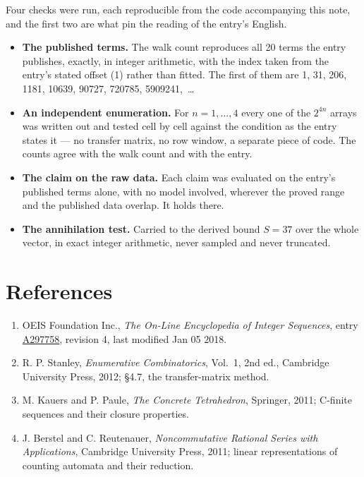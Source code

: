 \documentclass[11pt]{article}
\theoremstyle{definition}
\begin{document}
Four checks were run, each reproducible from the code accompanying this note, and the first two are what pin the reading of the entry's English.

\begin{itemize}

\item {\bfseries The published terms.} The walk count reproduces all 20 terms the entry publishes, exactly, in integer arithmetic, with the index taken from the entry's stated offset (1) rather than fitted. The first of them are 1, 31, 206, 1181, 10639, 90727, 720785, 5909241,~\dots

\item {\bfseries An independent enumeration.} For $n = 1,\dots,4$ every one of the $2^{4n}$ arrays was written out and tested cell by cell against the condition as the entry states it --- no transfer matrix, no row window, a separate piece of code. The counts agree with the walk count and with the entry.

\item {\bfseries The claim on the raw data.} Each claim was evaluated on the entry's published terms alone, with no model involved, wherever the proved range and the published data overlap. It holds there.

\item {\bfseries The annihilation test.} Carried to the derived bound $S = 37$ over the whole vector, in exact integer arithmetic, never sampled and never truncated.

\end{itemize}

\section{References}

\begin{enumerate}

\item OEIS Foundation Inc., \emph{The On-Line Encyclopedia of Integer Sequences}, entry \href{https://oeis.org/A297758}{A297758}, revision 4, last modified Jan 05 2018.

\item R. P. Stanley, \emph{Enumerative Combinatorics}, Vol.~1, 2nd ed., Cambridge University Press, 2012; \S4.7, the transfer-matrix method.

\item M. Kauers and P. Paule, \emph{The Concrete Tetrahedron}, Springer, 2011; C-finite sequences and their closure properties.

\item J. Berstel and C. Reutenauer, \emph{Noncommutative Rational Series with Applications}, Cambridge University Press, 2011; linear representations of counting automata and their reduction.

\end{enumerate}
\end{document}
